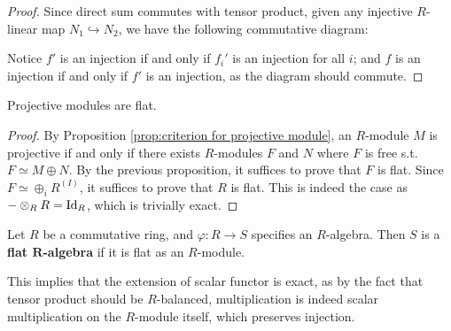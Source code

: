 \documentclass{article}
\begin{document}
\begin{proof}
    Since direct sum commutes with tensor product, given any injective $R$-linear map $N_1 \hookrightarrow N_2$, we have the following commutative diagram:
    \begin{figure}[htbp]
        \centering
    \end{figure}
    Notice $f'$ is an injection if and only if $f_i'$ is an injection for all $i$; and $f$ is an injection if and only if $f'$ is an injection, as the diagram should commute.
\end{proof}

\begin{corollary}
    Projective modules are flat.
\end{corollary}

\begin{proof}
    By Proposition \ref{prop:criterion for projective module}, an $R$-module $M$ is projective if and only if there exists $R$-modules $F$ and $N$ where $F$ is free s.t. $F \simeq M \oplus N$. By the previous proposition, it suffices to prove that $F$ is flat. Since $F \simeq \oplus_i R^{(I)}$, it suffices to prove that $R$ is flat. This is indeed the case as $- \otimes_R R = \mathrm{Id}_R$, which is trivially exact.
\end{proof}

\begin{definition}
    Let $R$ be a commutative ring, and $\varphi: R \to S$ specifies an $R$-algebra. Then $S$ is a \textbf{flat $\mathbf{R}$-algebra} if it is flat as an $R$-module. 
\end{definition}

\begin{remark}
    This implies that the extension of scalar functor is exact, as by the fact that tensor product should be $R$-balanced, multiplication is indeed scalar multiplication on the $R$-module itself, which preserves injection. 
\end{remark}
\end{document}
